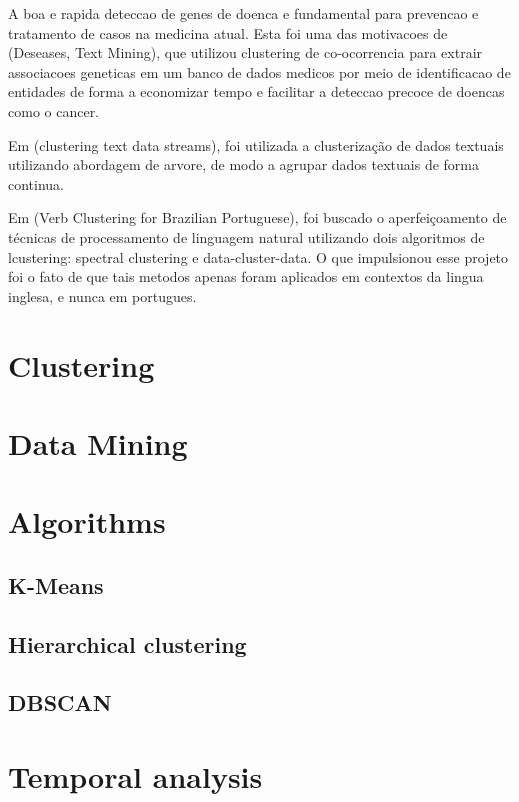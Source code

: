 \documentclass[12pt]{article}
\begin{document}
A boa e rapida deteccao de genes de doenca e fundamental para prevencao e tratamento de casos na medicina atual. Esta foi uma das motivacoes de (Deseases, Text Mining), que utilizou clustering de co-ocorrencia para extrair associacoes geneticas em um banco de dados medicos por meio de identificacao de entidades de forma a economizar tempo e facilitar a deteccao precoce de doencas como o cancer.

Em (clustering text data streams), foi utilizada a clusterização de dados textuais utilizando abordagem de arvore, de modo a agrupar dados textuais de forma continua.

Em (Verb Clustering for Brazilian Portuguese), foi buscado o aperfeiçoamento de técnicas de processamento de linguagem natural utilizando dois algoritmos de lcustering: spectral clustering e data-cluster-data. O que impulsionou esse projeto foi o fato de que tais metodos apenas foram aplicados em contextos da lingua inglesa, e nunca em portugues.

\section{Clustering}

\section{Data Mining}

\section{Algorithms}

\subsection{K-Means}

\subsection{Hierarchical clustering}

\subsection{DBSCAN}

\section{Temporal analysis}
\end{document}
